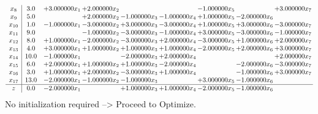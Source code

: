 \documentclass[10pt]{article}
\begin{document}
\[\begin{array}{c| c c@{\hskip 2pt} c@{\hskip 2pt} c@{\hskip 2pt} c@{\hskip 2pt} c@{\hskip 2pt} c@{\hskip 2pt} c@{\hskip 2pt} }
 x_{8}   &  3.0 & + 3.000000 x_{1} & + 2.000000 x_{2} &    &   & -1.000000 x_{5} &   & + 3.000000 x_{7}\\
 x_{9}   &  5.0  &   & + 2.000000 x_{2} & -1.000000 x_{3} & -1.000000 x_{4} & + 1.000000 x_{5} & -2.000000 x_{6} &   \\
 x_{10}   &  1.0 & -1.000000 x_{1} & -3.000000 x_{2} & + 3.000000 x_{3} & -3.000000 x_{4} & + 1.000000 x_{5} & + 3.000000 x_{6} & -3.000000 x_{7}\\
 x_{11}   &  9.0  &   & -1.000000 x_{2} & -3.000000 x_{3} & -1.000000 x_{4} & + 3.000000 x_{5} & -3.000000 x_{6} & -1.000000 x_{7}\\
 x_{12}   &  8.0 & + 1.000000 x_{1} & -2.000000 x_{2} & -3.000000 x_{3} & + 2.000000 x_{4} & -3.000000 x_{5} & + 1.000000 x_{6} & + 2.000000 x_{7}\\
 x_{13}   &  4.0 & + 3.000000 x_{1} & + 1.000000 x_{2} & + 1.000000 x_{3} & + 1.000000 x_{4} & -2.000000 x_{5} & + 2.000000 x_{6} & + 3.000000 x_{7}\\
 x_{14}   &  10.0 & -1.000000 x_{1} &   & -2.000000 x_{3} & + 2.000000 x_{4} &    &   & + 2.000000 x_{7}\\
 x_{15}   &  6.0 & + 2.000000 x_{1} & + 1.000000 x_{2} & + 1.000000 x_{3} & -2.000000 x_{4} &   & -2.000000 x_{6} & -3.000000 x_{7}\\
 x_{16}   &  3.0 & + 1.000000 x_{1} & + 2.000000 x_{2} & -3.000000 x_{3} & + 1.000000 x_{4} &   & -1.000000 x_{6} & + 3.000000 x_{7}\\
 x_{17}   &  13.0 & -2.000000 x_{1} & -1.000000 x_{2} & -1.000000 x_{3} &   & + 3.000000 x_{5} & -1.000000 x_{6} &   \\
\hline
z    &  0.0 & -2.000000 x_{1} &   & + 1.000000 x_{3} & + 1.000000 x_{4} & -2.000000 x_{5} & -1.000000 x_{6} &   \\
\end{array}\]
No initialization required --> Proceed to Optimize. 
\end{document}
